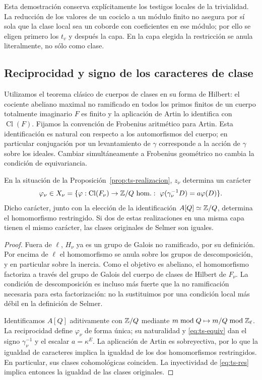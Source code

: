 Esta demostración conserva explícitamente los testigos locales de la trivialidad. La reducción de los valores de un cociclo a un módulo finito no asegura por sí sola que la clase local sea un coborde con coeficientes en ese módulo; por ello se eligen primero los $t_v$ y después la capa. En la capa elegida la restricción se anula literalmente, no sólo como clase.

\subsection{Reciprocidad y signo de los caracteres de clase}

Utilizamos el teorema clásico de cuerpos de clases en su forma de Hilbert: el cociente abeliano maximal no ramificado en todos los primos finitos de un cuerpo totalmente imaginario $F$ es finito y la aplicación de Artin lo identifica con $\operatorname{Cl}(F)$. Fijamos la convención de Frobenius aritmético para Artin. Esta identificación es natural con respecto a los automorfismos del cuerpo; en particular conjugación por un levantamiento de $\gamma$ corresponde a la acción de $\gamma$ sobre los ideales. Cambiar simultáneamente a Frobenius geométrico no cambia la condición de equivariancia.

\begin{proposicion}
\label{prop:ts-artin}
En la situación de la Proposición~\ref{prop:ts-realizacion}, $z_\nu$ determina un carácter
\begin{equation}
 \varphi_\nu\in X_\nu=\{\varphi:\operatorname{Cl}(F_\nu)\to\mathbb{Z}/Q\text{ hom.}:\
 \varphi(\gamma_\nu^{-1}D)=a\varphi(D)\}.
 \label{eq:ts-x}
\end{equation}
Dicho carácter, junto con la elección de la identificación $A[Q]\simeq\mathbb{Z}/Q$, determina el homomorfismo restringido. Si dos de estas realizaciones en una misma capa tienen el mismo carácter, las clases originales de Selmer son iguales.
\end{proposicion}
\begin{proof}
Fuera de $\ell$, $H_\nu$ ya es un grupo de Galois no ramificado, por su definición. Por encima de $\ell$ el homomorfismo se anula sobre los grupos de descomposición, y en particular sobre la inercia. Como el objetivo es abeliano, el homomorfismo factoriza a través del grupo de Galois del cuerpo de clases de Hilbert de $F_\nu$. La condición de descomposición es incluso más fuerte que la no ramificación necesaria para esta factorización: no la sustituimos por una condición local más débil en la definición de Selmer.

Identificamos $A[Q]$ aditivamente con $\mathbb{Z}/Q$ mediante $m\bmod Q\mapsto m/Q\bmod\mathbb{Z}_\ell$. La reciprocidad define $\varphi_\nu$ de forma única; su naturalidad y \eqref{eq:ts-equiv} dan el signo $\gamma_\nu^{-1}$ y el escalar $a=\kappa^E$. La aplicación de Artin es sobreyectiva, por lo que la igualdad de caracteres implica la igualdad de los dos homomorfismos restringidos. En particular, sus clases cohomológicas coinciden. La inyectividad de \eqref{eq:ts-res} implica entonces la igualdad de las clases originales.
\end{proof}

